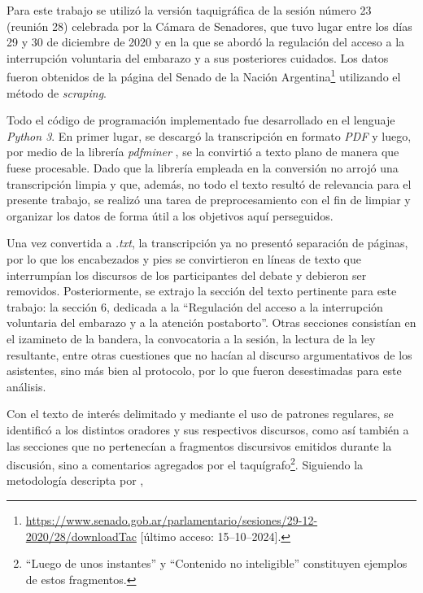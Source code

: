 Para este trabajo se utiliz\'o la versi\'on {taquigr\'afica} de la sesi\'on n\'umero
23 (reuni\'on 28) celebrada por la {C\'amara} de Senadores, que tuvo lugar entre los d\'ias
29 y 30 de diciembre de 2020 y en la que se abord\'o la
regulaci\'on del acceso a la interrupci\'on voluntaria del embarazo y a sus
posteriores cuidados. Los datos fueron obtenidos de la {p\'agina} del Senado de la Naci\'on
Argentina\footnote{\url{https://www.senado.gob.ar/parlamentario/sesiones/29-12-2020/28/downloadTac}
[\'ultimo acceso: 15--10--2024].}
utilizando el m\'etodo de \textit{scraping}.\par
Todo el c\'odigo de programaci\'on implementado fue desarrollado en el lenguaje
\textit{Python 3}. En primer lugar, se descarg\'o la transcripci\'on en formato \textit{PDF} y luego, por
medio de la librer\'ia \textit{pdfminer} \citet{pdfminer@doc},
se la convirti\'o a texto plano de manera que fuese procesable. Dado que la librer\'ia
empleada en la conversi\'on no arroj\'o una transcripci\'on limpia y que, {adem\'as}, no todo el texto
result\'o de relevancia para el presente trabajo, se {realiz\'o} una tarea de
preprocesamiento con el fin de limpiar y organizar los datos de forma \'util a los
objetivos aqu\'i perseguidos.\par
Una vez convertida a \textit{.txt}, la transcripci\'on ya no present\'o separaci\'on de
{p\'aginas}, por lo que los encabezados y pies se convirtieron en l\'ineas de texto que
interrump\'ian los discursos de los participantes del debate y debieron
ser removidos.
Posteriormente, se extrajo la secci\'on del texto pertinente para este trabajo:
la secci\'on 6, dedicada a la ``Regulaci\'on  del  acceso  a  la  interrupci\'on
voluntaria  del  embarazo  y  a  la atenci\'on postaborto''. Otras secciones consist\'ian
en el izamineto de la bandera, la convocatoria a la sesi\'on, la lectura de la ley
resultante, entre otras cuestiones que no hac\'ian al discurso argumentativos de los
asistentes, sino {m\'as} bien al protocolo, por lo que fueron desestimadas
para este {an\'alisis}.\par
Con el texto de inter\'es delimitado y mediante el uso de patrones regulares, se
identific\'o a los distintos oradores y sus respectivos discursos, como as\'i tambi\'en
a las secciones que no pertenec\'ian a fragmentos discursivos emitidos durante la
discusi\'on, sino a comentarios agregados por el taqu\'igrafo\footnote{``Luego de unos
instantes'' y ``Contenido no inteligible'' constituyen ejemplos de estos
fragmentos.}. Siguiendo la metodolog\'ia descripta por \cite{monroe2008fightin},
